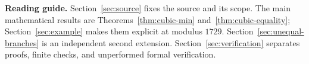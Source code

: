 \documentclass[11pt,a4paper]{article}
\begin{document}
\hypersetup{pageanchor=true}
\tableofcontents
\bigskip
\noindent\textbf{Reading guide.}
Section~\ref{sec:source} fixes the source and its scope.
The main mathematical results are Theorems~\ref{thm:cubic-min}
and~\ref{thm:cubic-equality}; Section~\ref{sec:example} makes them
explicit at modulus $1729$.
Section~\ref{sec:unequal-branches} is an independent second extension.
Section~\ref{sec:verification} separates proofs, finite checks, and
unperformed formal verification.
\clearpage
{}





\appendix

\clearpage


\end{document}
